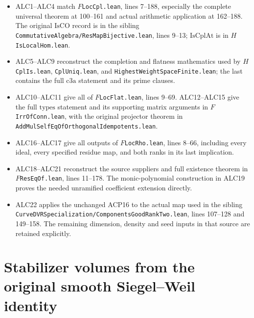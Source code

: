 \documentclass[11pt,a4paper]{article}
\numberwithin{equation}{section}
\theoremstyle{remark}\newtheorem{remark}[theorem]{Remark}
\begin{document}
\begin{itemize}
\item ALC1--ALC4 match \(F\)\texttt{Loc\allowbreak Cpl.\allowbreak lean},
lines 7--188, especially the complete universal theorem at
100--161 and actual arithmetic application at 162--188.
The original \(\mathrm{IsCO}\) record is in the sibling
\texttt{Commutative\allowbreak Algebra/\allowbreak Res\allowbreak Map\allowbreak Bijective.\allowbreak lean}, lines 9--13;
\(\mathrm{IsCplAt}\) is in \(H\)\texttt{Is\allowbreak Local\allowbreak Hom.\allowbreak lean}.
\item ALC5--ALC9 reconstruct the completion and flatness
mathematics used by \(H\)\texttt{Cpl\allowbreak Is.\allowbreak lean},
\texttt{Cpl\allowbreak Uniq.\allowbreak lean}, and
\texttt{Highest\allowbreak Weight\allowbreak Space\allowbreak Finite.\allowbreak lean}; the last contains
the full \(\mathrm{c3a}\) statement and its prime clauses.
\item ALC10--ALC11 give all of \(F\)\texttt{Loc\allowbreak Flat.\allowbreak lean},
lines 9--69.  ALC12--ALC15 give the full \(\mathrm{types}\)
statement and its supporting matrix arguments in
\(F\)\texttt{Irr\allowbreak Of\allowbreak Conn.\allowbreak lean}, with the original projector
theorem in \texttt{Add\allowbreak Mul\allowbreak Self\allowbreak Eq\allowbreak Of\allowbreak Orthogonal\allowbreak Idempotents.\allowbreak lean}.
\item ALC16--ALC17 give all outputs of
\(F\)\texttt{Loc\allowbreak Rho.\allowbreak lean}, lines 8--66, including every
ideal, every specified residue map, and both ranks in its
last implication.
\item ALC18--ALC21 reconstruct the source suppliers and
full existence theorem in \(F\)\texttt{Res\allowbreak Eq\allowbreak Of.\allowbreak lean},
lines 11--178.  The monic-polynomial construction in ALC19
proves the needed unramified coefficient extension directly.
\item ALC22 applies the unchanged ACP16 to the actual map
used in the sibling
\texttt{Curve\allowbreak DVRSpecialization/\allowbreak Components\allowbreak Good\allowbreak Rank\allowbreak Two.\allowbreak lean},
lines 107--128 and 149--158.  The remaining dimension,
density and seed inputs in that source are retained explicitly.
\end{itemize}


\section{Stabilizer volumes from the original smooth Siegel--Weil identity}
\end{document}

